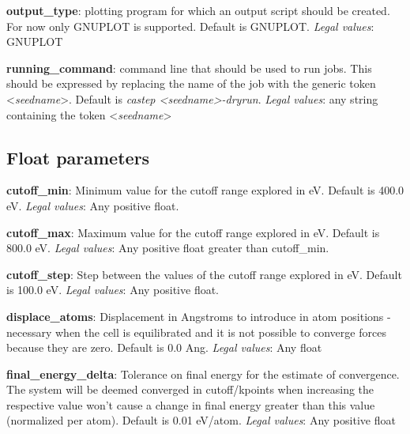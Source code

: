 \documentclass[10pt]{article}
\begin{document}
\textbf{output\_type}: plotting program for which an output script should be created. For now only GNUPLOT is supported. Default is GNUPLOT.\newline
\textit{Legal values}: GNUPLOT\newline

\textbf{running\_command}: command line that should be used to run jobs. This should be expressed by replacing the name of the job with the generic token \textless \textit{seedname}\textgreater. Default is \textit{castep \textless seedname\textgreater -dryrun}.\newline
\textit{Legal values}: any string containing the token \textless \textit{seedname}\textgreater\newline

\subsection{Float parameters}

\textbf{cutoff\_min}: Minimum value for the cutoff range explored in eV. Default is 400.0 eV.\newline
\textit{Legal values}: Any positive float.\newline

\textbf{cutoff\_max}: Maximum value for the cutoff range explored in eV. Default is 800.0 eV.\newline
\textit{Legal values}: Any positive float greater than cutoff\_min.\newline

\textbf{cutoff\_step}: Step between the values of the cutoff range explored in eV. Default is 100.0 eV.\newline
\textit{Legal values}: Any positive float.\newline

\textbf{displace\_atoms}: Displacement in Angstroms to introduce in atom positions - necessary when the cell is equilibrated and it is not possible to converge forces because they are zero. Default is 0.0 Ang.\newline
\textit{Legal values}: Any float\newline

\textbf{final\_energy\_delta}: Tolerance on final energy for the estimate of convergence. The system will be deemed converged in cutoff/kpoints when increasing the respective value won't cause a change in final energy greater than this value (normalized per atom). Default is 0.01 eV/atom.\newline
\textit{Legal values}: Any positive float\newline
\end{document}
